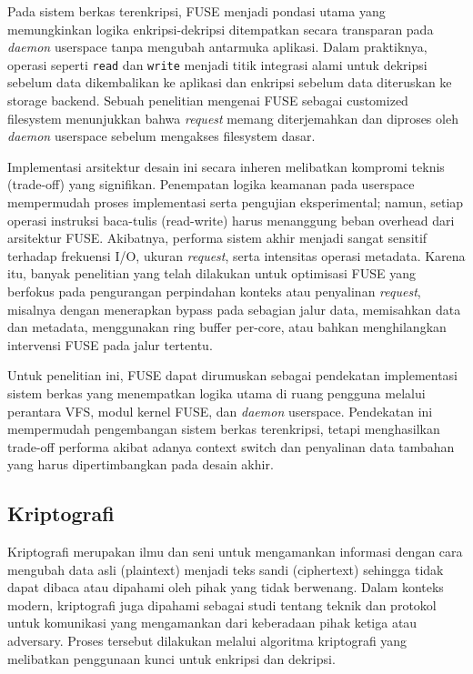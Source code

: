 Pada sistem berkas terenkripsi, FUSE menjadi pondasi utama yang memungkinkan logika enkripsi-dekripsi ditempatkan secara transparan pada \textit{daemon} userspace tanpa mengubah antarmuka aplikasi\cite{Lembke2022DEFUSE:}. Dalam praktiknya, operasi seperti \texttt{read} dan \texttt{write} menjadi titik integrasi alami untuk dekripsi sebelum data dikembalikan ke aplikasi dan enkripsi sebelum data diteruskan ke storage backend. Sebuah penelitian mengenai FUSE sebagai customized filesystem menunjukkan bahwa \textit{request} memang diterjemahkan dan diproses oleh \textit{daemon} userspace sebelum mengakses filesystem dasar.

Implementasi arsitektur desain ini secara inheren melibatkan kompromi teknis (trade-off) yang signifikan. Penempatan logika keamanan pada userspace mempermudah proses implementasi serta pengujian eksperimental; namun, setiap operasi instruksi baca-tulis (read-write) harus menanggung beban overhead dari arsitektur FUSE. Akibatnya, performa sistem akhir menjadi sangat sensitif terhadap frekuensi I/O, ukuran \textit{request}, serta intensitas operasi metadata\cite{Huai2021XFUSEAI,Faria2021BDUS:}. Karena itu, banyak penelitian yang telah dilakukan untuk optimisasi FUSE yang berfokus pada pengurangan perpindahan konteks atau penyalinan \textit{request}, misalnya dengan menerapkan bypass pada sebagian jalur data, memisahkan data dan metadata, menggunakan ring buffer per-core, atau bahkan menghilangkan intervensi FUSE pada jalur tertentu\cite{ChoRFUSE,Lembke2022DEFUSE:,Zou2022UserLevel,YanDefuse}.

Untuk penelitian ini, FUSE dapat dirumuskan sebagai pendekatan implementasi sistem berkas yang menempatkan logika utama di ruang pengguna melalui perantara VFS, modul kernel FUSE, dan \textit{daemon} userspace. Pendekatan ini mempermudah pengembangan sistem berkas terenkripsi, tetapi menghasilkan trade-off performa akibat adanya context switch dan penyalinan data tambahan yang harus dipertimbangkan pada desain akhir.

\subsection{Kriptografi}
Kriptografi merupakan ilmu dan seni untuk mengamankan informasi dengan cara mengubah data asli (plaintext) menjadi teks sandi (ciphertext) sehingga tidak dapat dibaca atau dipahami oleh pihak yang tidak berwenang\cite{}. Dalam konteks modern, kriptografi juga dipahami sebagai studi tentang teknik dan protokol untuk komunikasi yang mengamankan dari keberadaan pihak ketiga atau adversary\cite{}. Proses tersebut dilakukan melalui algoritma kriptografi yang melibatkan penggunaan kunci untuk enkripsi dan dekripsi.

